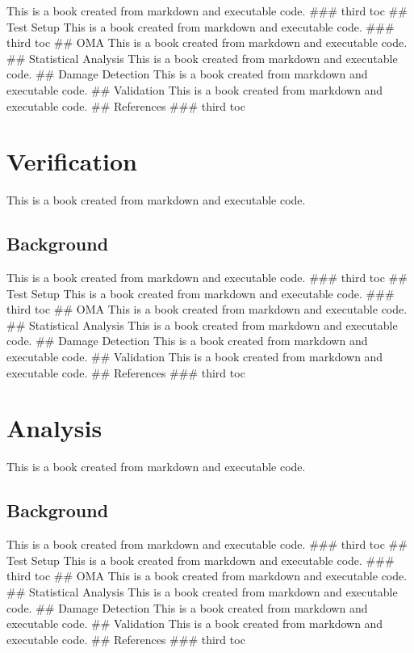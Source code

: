 \documentclass[
  letterpaper,
  DIV=11,
  numbers=noendperiod]{scrreprt}
\begin{document}
This is a book created from markdown and executable code. \#\#\# third
toc \#\# Test Setup This is a book created from markdown and executable
code. \#\#\# third toc \#\# OMA This is a book created from markdown and
executable code. \#\# Statistical Analysis This is a book created from
markdown and executable code. \#\# Damage Detection This is a book
created from markdown and executable code. \#\# Validation This is a
book created from markdown and executable code. \#\# References \#\#\#
third toc

\hypertarget{verification-1}{%
\chapter{Verification}\label{verification-1}}

This is a book created from markdown and executable code.

\hypertarget{background-11}{%
\section{Background}\label{background-11}}

This is a book created from markdown and executable code. \#\#\# third
toc \#\# Test Setup This is a book created from markdown and executable
code. \#\#\# third toc \#\# OMA This is a book created from markdown and
executable code. \#\# Statistical Analysis This is a book created from
markdown and executable code. \#\# Damage Detection This is a book
created from markdown and executable code. \#\# Validation This is a
book created from markdown and executable code. \#\# References \#\#\#
third toc

\hypertarget{analysis-1}{%
\chapter{Analysis}\label{analysis-1}}

This is a book created from markdown and executable code.

\hypertarget{background-12}{%
\section{Background}\label{background-12}}

This is a book created from markdown and executable code. \#\#\# third
toc \#\# Test Setup This is a book created from markdown and executable
code. \#\#\# third toc \#\# OMA This is a book created from markdown and
executable code. \#\# Statistical Analysis This is a book created from
markdown and executable code. \#\# Damage Detection This is a book
created from markdown and executable code. \#\# Validation This is a
book created from markdown and executable code. \#\# References \#\#\#
third toc
\end{document}
